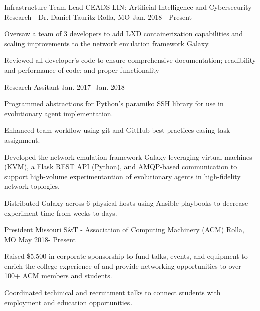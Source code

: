 \begin{cventries}
\cventry
  {Infrastructure Team Lead} %
  {CEADS-LIN: Artificial Intelligence and Cybersecurity Research - Dr. Daniel Tauritz} %
  {Rolla, MO} %
  {Jan. 2018 - Present} %
  {
    \begin{cvitems} %
      \item {Oversaw a team of 3 developers to add LXD containerization capabilities and scaling improvements to the network emulation framework Galaxy.}
      \item {Reviewed all developer's code to ensure comprehensive documentation; readibility and performance of code; and proper functionality}
    \end{cvitems}
  }

\cventry
  {Research Assitant} %
  {} %
  {} %
  {Jan. 2017- Jan. 2018} %
  {
    \begin{cvitems} %
      \item {Programmed abstractions for Python’s paramiko SSH library for use in evolutionary agent implementation.}
      \item {Enhanced team workflow using git and GitHub best practices easing task assignment.}
      \item {Developed the network emulation framework Galaxy leveraging virtual machines (KVM), a Flask REST API (Python), and AMQP-based communication to support high-volume experimentantion of evolutionary agents in high-fidelity network toplogies.}
			\item {Distributed Galaxy across 6 physical hosts using Ansible playbooks to decrease experiment time from weeks to days.}
    \end{cvitems}
  }


\cventry
  {President} %
  {Missouri S\&T - Association of Computing Machinery (ACM)} %
  {Rolla, MO} %
  {May 2018- Present} %
  {
    \begin{cvitems} %
      \item {Raised \$5,500 in corporate sponsorship to fund talks, events, and equipment to enrich the college experience of and provide networking opportunities to over 100+ ACM members and students.} 
      \item {Coordinated techinical and recruitment talks to connect students with employment and education opportunities.}
    \end{cvitems}
  }


\end{cventries}
